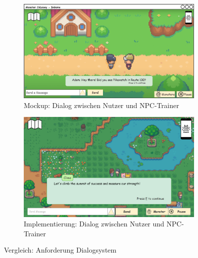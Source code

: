 \begin{figure}[H]
    \centering
    \begin{subfigure}[b]{0.4\textwidth}
        \includegraphics[width=\textwidth]{images/mockups/General/PlayerAndNPCMessage.png}
        \caption{Mockup: Dialog zwischen Nutzer und NPC-Trainer}
        \label{fig: Mockup: Dialog zwischen Nutzer und NPC-Trainer}
    \end{subfigure}
    \hfill
    \begin{subfigure}[b]{0.4\textwidth}
        \includegraphics[width=\textwidth]{images/implementation/General/Implementierung Dialog.png}
        \caption{Implementierung: Dialog zwischen Nutzer und NPC-Trainer}
        \label{fig: Implementierung: Dialog zwischen Nutzer und NPC-Trainer}
    \end{subfigure}
    \caption{Vergleich: Anforderung Dialogsystem}
    \label{fig: Vergleich: Anforderung Dialogsystem}
\end{figure}